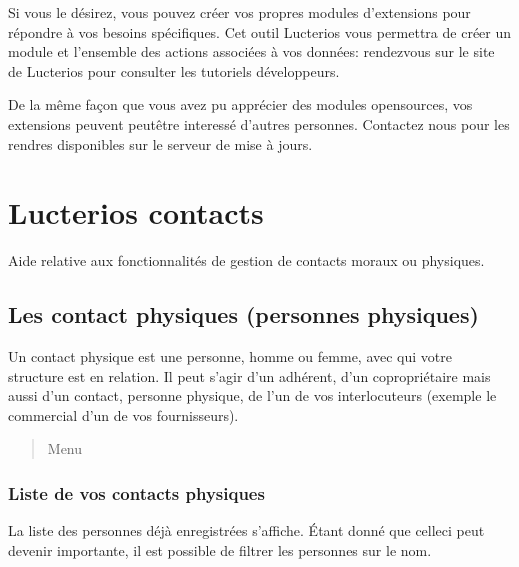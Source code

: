 \documentclass[letterpaper,10pt,french]{sphinxmanual}
\begin{document}
\sphinxAtStartPar
Si vous le désirez, vous pouvez créer vos propres modules d’extensions pour répondre à vos besoins spécifiques.
Cet outil Lucterios vous permettra de créer un module et l’ensemble des actions associées à vos données: rendez\sphinxhyphen{}vous sur le site de Lucterios pour consulter les tutoriels développeurs.

\sphinxAtStartPar
De la même façon que vous avez pu apprécier des modules open\sphinxhyphen{}sources, vos extensions peuvent peut\sphinxhyphen{}être interessé d’autres personnes.
Contactez nous pour les rendres disponibles sur le serveur de mise à jours.
\begin{quote}

\sphinxAtStartPar
{}

\sphinxAtStartPar
{}
\end{quote}

\sphinxstepscope


\chapter{Lucterios contacts}
\label{\detokenize{contacts/index:lucterios-contacts}}\label{\detokenize{contacts/index::doc}}
\sphinxAtStartPar
Aide relative aux fonctionnalités de gestion de contacts moraux ou physiques.

\sphinxstepscope


\section{Les contact physiques (personnes physiques)}
\label{\detokenize{contacts/individual:les-contact-physiques-personnes-physiques}}\label{\detokenize{contacts/individual::doc}}
\sphinxAtStartPar
Un contact physique est une personne, homme ou femme, avec qui votre structure est en relation. Il peut s’agir d’un adhérent, d’un copropriétaire mais aussi d’un contact, personne physique, de l’un de vos interlocuteurs (exemple le commercial d’un de vos fournisseurs).
\begin{quote}

\sphinxAtStartPar
Menu 
\end{quote}


\subsection{Liste de vos contacts physiques}
\label{\detokenize{contacts/individual:liste-de-vos-contacts-physiques}}
\sphinxAtStartPar
La liste des personnes déjà enregistrées s’affiche. Étant donné que celle\sphinxhyphen{}ci peut devenir importante, il est possible de filtrer les personnes sur le nom.
\end{document}
